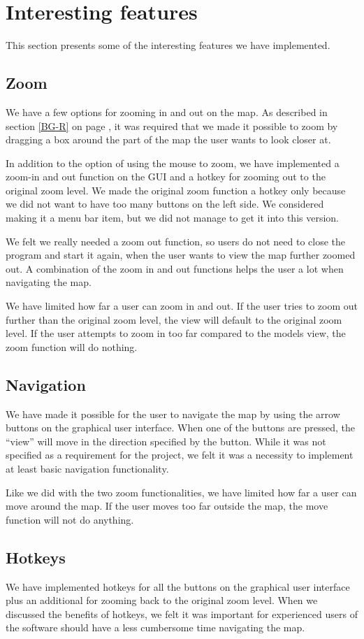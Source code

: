 \section{Interesting features}
\label{UIA-IF}
This section presents some of the interesting features we have implemented.
\subsection{Zoom}
\label{UIA-IF-Z}
We have a few options for zooming in and out on the map. As described in
section \ref{BG-R}  on page \pageref{BG-R}, it
was required that we made it possible to zoom by dragging a box around the part 
of the map the user wants to look closer at.

In addition to the option of using the mouse to zoom, we have implemented a
zoom-in and out function on the GUI and a hotkey for zooming out to the original
zoom level. We made the original zoom function a hotkey only because we did not
want to have too many buttons on the left side. We considered making it a menu bar
item, but we did not manage to get it into this version.

We felt we really needed a zoom out function, so users do not need to close the
program and start it again, when the user wants to view the map further zoomed
out. A combination of the zoom in and out functions helps the user a lot when
navigating the map.

We have limited how far a user can zoom in and out. If the user tries to zoom
out further than the original zoom level, the view will default to the original
zoom level. If the user attempts to zoom in too far compared to the models view,
the zoom function will do nothing.
\subsection{Navigation}
\label{UIA-IF-N}
We have made it possible for the user to navigate the map by using the arrow
buttons on the graphical user interface. When one of the buttons are pressed,
the ``view'' will move in the direction specified by the button. While it was
not specified as a requirement for the project, we felt it was a necessity to
implement at least basic navigation functionality.

Like we did with the two zoom functionalities, we have limited how far a user
can move around the map. If the user moves too far outside the map, the move
function will not do anything.
\subsection{Hotkeys}
\label{UIA-IF-H}
We have implemented hotkeys for all the buttons on the graphical user interface
plus an additional for zooming back to the original zoom level. When we
discussed the benefits of hotkeys, we felt it was important for experienced users of the
software should have a less cumbersome time navigating the map. 

